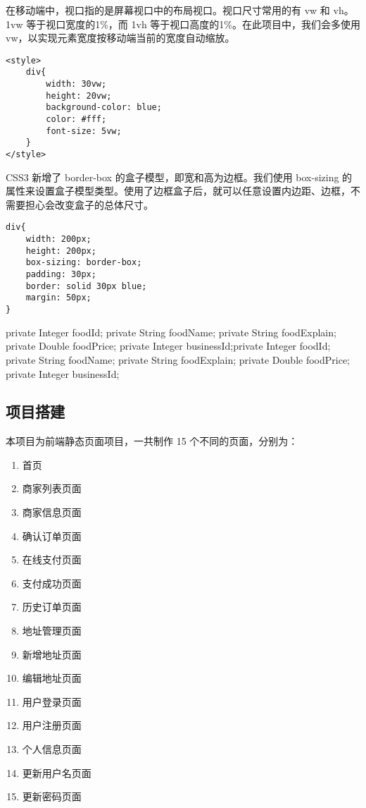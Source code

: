 在移动端中，视口指的是屏幕视口中的布局视口。视口尺寸常用的有 vw 和 vh。1vw 等于视口宽度的1\%，而 1vh 等于视口高度的1\%。在此项目中，我们会多使用 vw，以实现元素宽度按移动端当前的宽度自动缩放。
\begin{lstlisting}[basicstyle=\footnotesize]
<style>
    div{
        width: 30vw;
        height: 20vw;
        background-color: blue;
        color: #fff;
        font-size: 5vw;
    }
</style>
\end{lstlisting}

CSS3 新增了 border-box 的盒子模型，即宽和高为边框。我们使用 box-sizing 的属性来设置盒子模型类型。使用了边框盒子后，就可以任意设置内边距、边框，不需要担心会改变盒子的总体尺寸。
\begin{lstlisting}[basicstyle=\footnotesize]
div{
    width: 200px;
    height: 200px;
    box-sizing: border-box; 
    padding: 30px;
    border: solid 30px blue;
    margin: 50px;
}
\end{lstlisting}
private Integer foodId;
private String foodName;
private String foodExplain;
private Double foodPrice;
private Integer businessId;private Integer foodId;
private String foodName;
private String foodExplain;
private Double foodPrice;
private Integer businessId;
\subsection{项目搭建}
本项目为前端静态页面项目，一共制作 15 个不同的页面，分别为：
\begin{enumerate}
    \item{首页}
    \item {商家列表页面}
    \item {商家信息页面}
    \item {确认订单页面}
    \item {在线支付页面}
    \item {支付成功页面}
    \item {历史订单页面}
    \item {地址管理页面}
    \item {新增地址页面}
    \item {编辑地址页面}
    \item {用户登录页面}
    \item {用户注册页面}
    \item {个人信息页面}
    \item {更新用户名页面}
    \item {更新密码页面}
\end{enumerate}

